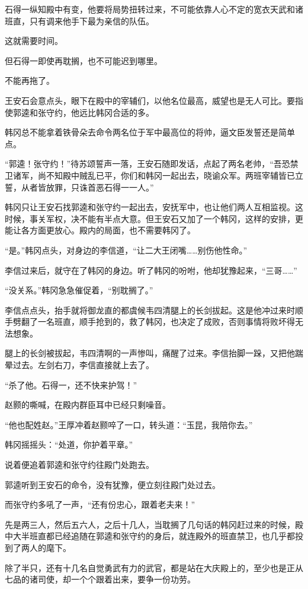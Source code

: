 石得一纵知殿中有变，他要将局势扭转过来，不可能依靠人心不定的宽衣天武和诸班直，只有调来他手下最为亲信的队伍。

这就需要时间。

但石得一即使再耽搁，也不可能迟到哪里。

不能再拖了。

王安石会意点头，眼下在殿中的宰辅们，以他名位最高，威望也是无人可比。要指使郭逵和张守约，他远比韩冈合适的多。

韩冈总不能拿着铁骨朵去命令两名位于军中最高位的将帅，逼文臣发誓还是简单点。

“郭逵！张守约！”待苏颂誓声一落，王安石随即发话，点起了两名老帅，“吾恐禁卫诸军，尚不知殿中贼乱已平，你们和韩冈一起出去，晓谕众军。两班宰辅皆已立誓，从者皆放罪，只诛首恶石得一一人。”

韩冈只让王安石找郭逵和张守约一起出去，安抚军中，也让他们两人互相监视。这时候，事关军权，决不能有半点大意。但王安石又加了一个韩冈，这样的安排，更能让各方面更放心。殿内的局面，也不需要韩冈了。

“是。”韩冈点头，对身边的李信道，“让二大王闭嘴……别伤他性命。”

李信过来后，就守在了韩冈的身边。听了韩冈的吩咐，他却犹豫起来，“三哥……”

“没关系。”韩冈急急催促着，“别耽搁了。”

李信点点头，抬手就将御龙直的都虞候韦四清腿上的长剑拔起。这是他冲过来时顺手劈翻了一名班直，顺手抢到的，救了韩冈，也决定了成败，否则事情将败坏得无法想象。

腿上的长剑被拔起，韦四清啊的一声惨叫，痛醒了过来。李信抬脚一跺，又把他踹晕过去。左剑右刀，李信直接就上去了。

“杀了他。石得一，还不快来护驾！”

赵颢的嘶喊，在殿内群臣耳中已经只剩噪音。

“他也配姓赵。”王厚冲着赵颢啐了一口，转头道：“玉昆，我陪你去。”

韩冈摇摇头：“处道，你护着平章。”

说着便追着郭逵和张守约往殿门处跑去。

郭逵听到王安石的命令，没有犹豫，便立刻往殿门处过去。

而张守约多吼了一声，“还有份忠心，跟着老夫来！”

先是两三人，然后五六人，之后十几人，当耽搁了几句话的韩冈赶过来的时候，殿中大半班直都已经追随在郭逵和张守约的身后，就连殿外的班直禁卫，也几乎都投到了两人的麾下。

除了半只，还有十几名自觉勇武有力的武官，都是站在大庆殿上的，至少也是正从七品的诸司使，却一个个跟着出来，要争一份功劳。

